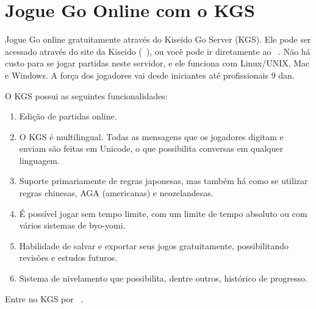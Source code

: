 \chapter{Jogue Go Online com o KGS}

Jogue Go online gratuitamente através do Kiseido Go Server (KGS). Ele pode ser acessado através do site da Kiseido (\href{https://www.kiseido.com}{}~\cite{kiseido}), ou você pode ir diretamente ao \href{https://www.gokgs.com}{}~\cite{kgs}. Não há custo para se jogar partidas neste servidor, e ele funciona com Linux/UNIX, Mac e Windows. A força dos jogadores vai desde iniciantes até profissionais 9 dan.

O KGS possui as seguintes funcionalidades:

\begin{enumerate}
    \item Edição de partidas online.
    \item O KGS é multilingual. Todas as mensagens que os jogadores digitam e enviam são feitas em Unicode, o que possibilita conversas em qualquer linguagem.
    \item Suporte primariamente de regras japonesas, mas também há como se utilizar regras chinesas, AGA (americanas) e neozelandesas.
    \item É possível jogar sem tempo limite, com um limite de tempo absoluto ou com vários sistemas de byo-yomi.
    \item Habilidade de salvar e exportar seus jogos gratuitamente, possibilitando revisões e estudos futuros.
    \item Sistema de nivelamento que possibilita, dentre outros, histórico de progresso. 
\end{enumerate}

Entre no KGS por \href{https://www.gokgs.com}{}~\cite{kgs}.